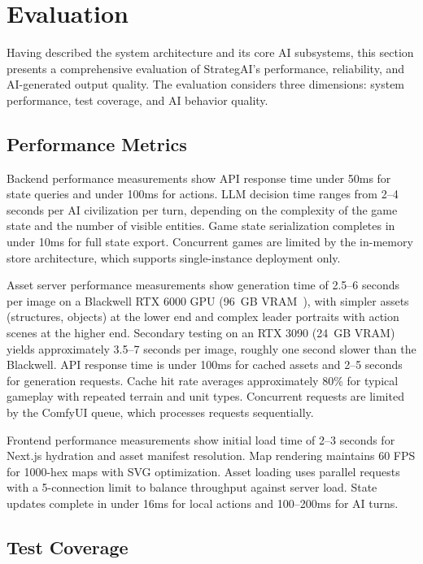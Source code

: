 \documentclass[conference]{IEEEtran}
\begin{document}
\section{Evaluation}
\label{sec:evaluation}

Having described the system architecture and its core AI subsystems, this section presents a comprehensive evaluation of StrategAI's performance, reliability, and AI-generated output quality. The evaluation considers three dimensions: system performance, test coverage, and AI behavior quality.

\subsection{Performance Metrics}

Backend performance measurements show API response time under 50ms for state queries and under 100ms for actions. LLM decision time ranges from 2--4 seconds per AI civilization per turn, depending on the complexity of the game state and the number of visible entities. Game state serialization completes in under 10ms for full state export. Concurrent games are limited by the in-memory store architecture, which supports single-instance deployment only.

Asset server performance measurements show generation time of 2.5--6 seconds per image on a Blackwell RTX 6000 GPU (96~GB VRAM~\cite{nvidia2024blackwell}), with simpler assets (structures, objects) at the lower end and complex leader portraits with action scenes at the higher end. Secondary testing on an RTX 3090 (24~GB VRAM) yields approximately 3.5--7 seconds per image, roughly one second slower than the Blackwell. API response time is under 100ms for cached assets and 2--5 seconds for generation requests. Cache hit rate averages approximately 80\% for typical gameplay with repeated terrain and unit types. Concurrent requests are limited by the ComfyUI queue, which processes requests sequentially.

Frontend performance measurements show initial load time of 2--3 seconds for Next.js hydration and asset manifest resolution. Map rendering maintains 60 FPS for 1000-hex maps with SVG optimization. Asset loading uses parallel requests with a 5-connection limit to balance throughput against server load. State updates complete in under 16ms for local actions and 100--200ms for AI turns.

\subsection{Test Coverage}
\end{document}
